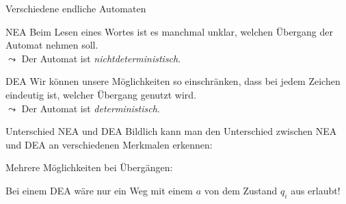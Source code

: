 %
%
%
%

\begin{frame}[fragile]{Verschiedene endliche Automaten}
    \begin{alertblock}{NEA}
        Beim Lesen eines Wortes ist es manchmal unklar, welchen Übergang der Automat nehmen soll.\\
        $\leadsto$ Der Automat ist \emph{\alert{nichtdeterministisch}}.
    \end{alertblock}
    \begin{alertblock}{DEA}
        Wir können unsere Möglichkeiten so einschränken, dass bei jedem Zeichen eindeutig ist, welcher Übergang genutzt wird.\\
        $\leadsto$ Der Automat ist \alert{\emph{deterministisch}}.
    \end{alertblock}
\end{frame}

\begin{frame}[fragile]{Unterschied NEA und DEA}
    Bildlich kann man den Unterschied zwischen NEA und DEA an verschiedenen Merkmalen erkennen:
    \begin{alertblock}{Mehrere Möglichkeiten bei Übergängen:}
        \begin{center}
        \end{center}
        Bei einem DEA wäre nur ein Weg mit einem \alert{$a$} von dem Zustand $q_i$ aus erlaubt!
    \end{alertblock}
\end{frame}

